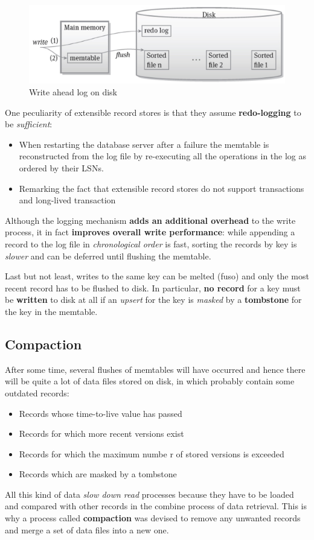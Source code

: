 \begin{figure}[!hbp]
    \centering
    \includegraphics[width=0.70\linewidth]{images/AdvancedDataManagment/extensible_record_store/write_ahead_logging.jpeg}
    \caption{Write ahead log on disk}
\end{figure}

One peculiarity of extensible record stores is that they assume \textbf{redo-logging} to be \textit{sufficient}:
\begin{itemize}
    \item  When restarting the database server after a failure the memtable is reconstructed from the log file by re-executing all the operations in the log as ordered by their LSNs.
    \item Remarking the fact that extensible record stores do not support transactions and long-lived transaction
\end{itemize}
Although the logging mechanism \textbf{adds an additional overhead} to the write process, it in fact \textbf{improves overall write performance}: while appending a record to the log file in \textit{chronological order} is fast, sorting the records by key is \textit{slower} and can be deferred until flushing the memtable.

Last but not least, writes to the same key can be melted (fuso) and only the most recent record has to be flushed to disk. In particular, \textbf{no record} for a key must be \textbf{written} to disk at all if an \textit{upsert} for the key is \textit{masked} by a \textbf{tombstone} for the key in the memtable.


\subsection{Compaction}
After some time, several flushes of memtables will have occurred and hence there will be quite a lot of data files stored on disk, in which probably contain some outdated records:
\begin{itemize}
    \item Records whose time-to-live value has passed
    \item Records for which more recent versions exist
    \item Records for which the maximum numbe r of stored versions is exceeded
    \item Records which are masked by a tombstone
\end{itemize}
All this kind of data \textit{slow down read} processes because they have to be loaded and compared with other records in the combine process of data retrieval. This is why a process called \textbf{compaction} was devised to remove any unwanted records and merge a set of data files into a new one.

